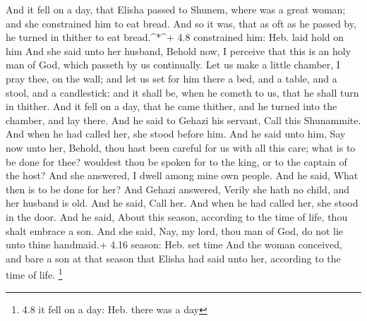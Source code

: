  And it fell on a day, that Elisha passed to Shunem, where
was a great woman; and she constrained him to eat bread. And so it was,
that as oft as he passed by, he turned in thither to eat
bread.\^{}*\^{}+ 4.8 constrained him: Heb. laid hold on him 
And she said unto her husband, Behold now, I perceive that this is an
holy man of God, which passeth by us continually.  Let us
make a little chamber, I pray thee, on the wall; and let us set for him
there a bed, and a table, and a stool, and a candlestick: and it shall
be, when he cometh to us, that he shall turn in thither. 
And it fell on a day, that he came thither, and he turned into the
chamber, and lay there.  And he said to Gehazi his servant,
Call this Shunammite. And when he had called her, she stood before him.
 And he said unto him, Say now unto her, Behold, thou hast
been careful for us with all this care; what is to be done for thee?
wouldest thou be spoken for to the king, or to the captain of the host?
And she answered, I dwell among mine own people.  And he
said, What then is to be done for her? And Gehazi answered, Verily she
hath no child, and her husband is old.  And he said, Call
her. And when he had called her, she stood in the door. 
And he said, About this season, according to the time of life, thou
shalt embrace a son. And she said, Nay, my lord, thou man of God, do not
lie unto thine handmaid.+ 4.16 season: Heb. set time  And
the woman conceived, and bare a son at that season that Elisha had said
unto her, according to the time of life. \footnote{4.8 it fell on a day:
  Heb. there was a day}

